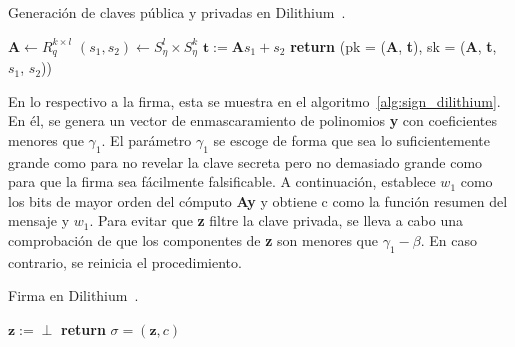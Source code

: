 \begin{algorithm}
    \caption{Generación de claves pública y privadas en Dilithium~\cite{dilithium_spec}.}
    \label{alg:gen_dilithium}
    \hspace{2mm}$\textbf{A} \gets R_q^{k\times l}$\newline
    $(s_1,s_2) \gets S_\eta^l \times S_\eta^{k}$\newline
    $\textbf{t} := \textbf{A}s_1 + s_2$\newline
    \textbf{return} (pk = (\textbf{A}, \textbf{t}), sk = (\textbf{A}, \textbf{t}, $s_1$, $s_2$))
\end{algorithm}

En lo respectivo a la firma, esta se muestra en el algoritmo~\ref{alg:sign_dilithium}.
En él, se genera un vector de enmascaramiento de polinomios \textbf{y} con coeficientes menores que $\gamma_1$.
El parámetro $\gamma_1$ se escoge de forma que sea lo suficientemente grande como para no revelar la clave secreta pero no demasiado grande como para que la firma sea fácilmente falsificable.
A continuación, establece $w_1$ como los bits de mayor orden del cómputo \textbf{Ay} y obtiene c como la función resumen del mensaje y $w_1$.
Para evitar que \textbf{z} filtre la clave privada, se lleva a cabo una comprobación de que los componentes de \textbf{z} son menores que $\gamma_1 - \beta$.
En caso contrario, se reinicia el procedimiento.

\begin{algorithm}
    \caption{Firma en Dilithium~\cite{dilithium_spec}.}
    \label{alg:sign_dilithium}
    \hspace{2mm}$\textbf{z} := \perp$\newline
    \textbf{return} $\sigma = (\textbf{z}, c)$
\end{algorithm}

